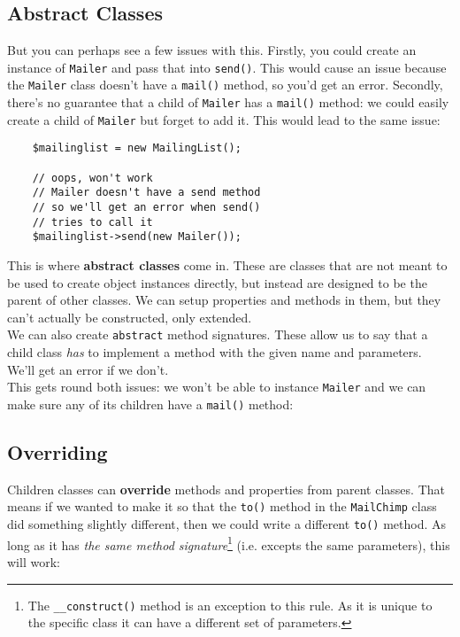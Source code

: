 \subsection{Abstract Classes}

But you can perhaps see a few issues with this. Firstly, you could create an instance of \texttt{Mailer} and pass that into \texttt{send()}. This would cause an issue because the \texttt{Mailer} class doesn't have a \texttt{mail()} method, so you'd get an error. Secondly, there's no guarantee that a child of \texttt{Mailer} has a \texttt{mail()} method: we could easily create a child of \texttt{Mailer} but forget to add it. This would lead to the same issue:

\begin{verbatim}
    $mailinglist = new MailingList();

    // oops, won't work
    // Mailer doesn't have a send method
    // so we'll get an error when send()
    // tries to call it
    $mailinglist->send(new Mailer());
\end{verbatim}


This is where \textbf{abstract classes} come in. These are classes that are not meant to be used to create object instances directly, but instead are designed to be the parent of other classes. We can setup properties and methods in them, but they can't actually be constructed, only extended.
\\

We can also create \texttt{abstract} method signatures. These allow us to say that a child class \textit{has} to implement a method with the given name and parameters. We'll get an error if we don't.
\\

This gets round both issues: we won't be able to instance \texttt{Mailer} and we can make sure any of its children have a \texttt{mail()} method:



\subsection{Overriding}

Children classes can \textbf{override} methods and properties from parent classes. That means if we wanted to make it so that the \texttt{to()} method in the \texttt{MailChimp} class did something slightly different, then we could write a different \texttt{to()} method. As long as it has \textit{the same method signature}\footnote{The \texttt{\_\_construct()} method is an exception to this rule. As it is unique to the specific class it can have a different set of parameters.} (i.e. excepts the same parameters), this will work:

